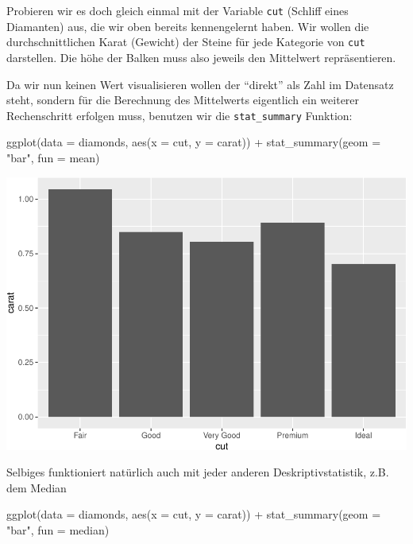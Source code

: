 \documentclass[
]{book}
\newenvironment{Shaded}{\begin{snugshade}}{\end{snugshade}}
\newcommand{\AttributeTok}[1]{\textcolor[rgb]{0.77,0.63,0.00}{#1}}
\newcommand{\FunctionTok}[1]{\textcolor[rgb]{0.00,0.00,0.00}{#1}}
\newcommand{\NormalTok}[1]{#1}
\newcommand{\SpecialCharTok}[1]{\textcolor[rgb]{0.00,0.00,0.00}{#1}}
\newcommand{\StringTok}[1]{\textcolor[rgb]{0.31,0.60,0.02}{#1}}
\begin{document}
Probieren wir es doch gleich einmal mit der Variable \texttt{cut} (Schliff eines Diamanten) aus, die wir oben bereits kennengelernt haben. Wir wollen die durchschnittlichen Karat (Gewicht) der Steine für jede Kategorie von \texttt{cut} darstellen. Die höhe der Balken muss also jeweils den Mittelwert repräsentieren.

Da wir nun keinen Wert visualisieren wollen der ``direkt'' als Zahl im Datensatz steht, sondern für die Berechnung des Mittelwerts eigentlich ein weiterer Rechenschritt erfolgen muss, benutzen wir die \texttt{stat\_summary} Funktion:

\begin{Shaded}
\begin{Highlighting}[]
\FunctionTok{ggplot}\NormalTok{(}\AttributeTok{data =}\NormalTok{ diamonds, }\FunctionTok{aes}\NormalTok{(}\AttributeTok{x =}\NormalTok{ cut, }\AttributeTok{y =}\NormalTok{ carat)) }\SpecialCharTok{+}
  \FunctionTok{stat\_summary}\NormalTok{(}\AttributeTok{geom =} \StringTok{"bar"}\NormalTok{, }\AttributeTok{fun =}\NormalTok{ mean) }
\end{Highlighting}
\end{Shaded}

\includegraphics{CFH_R_bookdown_files/figure-latex/unnamed-chunk-164-1.pdf}

Selbiges funktioniert natürlich auch mit jeder anderen Deskriptivstatistik, z.B. dem Median

\begin{Shaded}
\begin{Highlighting}[]
\FunctionTok{ggplot}\NormalTok{(}\AttributeTok{data =}\NormalTok{ diamonds, }\FunctionTok{aes}\NormalTok{(}\AttributeTok{x =}\NormalTok{ cut, }\AttributeTok{y =}\NormalTok{ carat)) }\SpecialCharTok{+}
  \FunctionTok{stat\_summary}\NormalTok{(}\AttributeTok{geom =} \StringTok{"bar"}\NormalTok{, }\AttributeTok{fun =}\NormalTok{ median) }
\end{Highlighting}
\end{Shaded}
\end{document}
